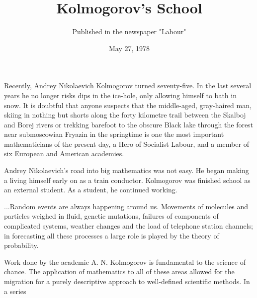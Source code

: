 \documentclass{article}
\begin{document}
\title{Kolmogorov's School}
\date{May 27, 1978}
\author{Published in the newspaper "Labour"}
\maketitle
Recently, Andrey Nikolaevich Kolmogorov turned seventy-five.
In the last several years he no longer risks dips in the ice-hole, only allowing himself to bath in snow.
It is doubtful that anyone suspects that the middle-aged, gray-haired man, skiing in nothing but shorts along the forty kilometre trail between the Skalboj and Borej rivers or trekking barefoot to the obscure Black lake through the forest near submoscowian Fryazin in the springtime is one the most important mathematicians of the present day, a Hero of Socialist Labour, and a member of six European and American academies.

Andrey Nikolaevich's road into big mathematics was not easy.
He began making a living himself early on as a train conductor. Kolmogorov was finished school as an external student.
As a student, he continued working.

...Random events are always happening around us.
Movements of molecules and particles weighed in fluid, genetic mutations, failures of components of complicated systems, weather changes and the load of telephone station channels; in forecasting all these processes a large role is played by the theory of probability.

Work done by the academic A. N. Kolmogorov is fundamental to the science of chance.
The application of mathematics to all of these areas allowed for the migration for a purely descriptive approach to well-defined scientific methods.
In a series
\end{document}
